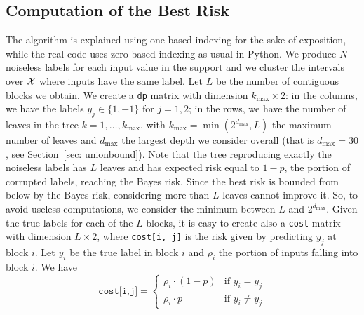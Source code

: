 \subsection{Computation of the Best Risk}\label{app: bestrisk} The algorithm is explained using one-based indexing for the sake of exposition, while the real code uses zero-based indexing as usual in Python. We produce $N$ noiseless labels for each input value in the support and we cluster the intervals over $\mathcal{X}$ where inputs have the same label. Let $L$ be the number of contiguous blocks we obtain. We create a \texttt{dp} matrix with dimension $k_{\max} \times 2$: in the columns, we have the labels $y_j \in\{1,-1\}$ for $j = 1,2$; in the rows, we have the number of leaves in the tree $k = 1,\ldots,k_{\max}$, with $k_{\max} = \min(2^{d_{\max}}, L)$ the maximum number of leaves and $d_{\max}$ the largest depth we consider overall (that is $d_{\max}=30$, see Section~\ref{sec: unionbound}). Note that the tree reproducing exactly the noiseless labels has $L$ leaves and has expected risk equal to $1-p$, the portion of corrupted labels, reaching the Bayes risk. Since the best risk is bounded from below by the Bayes risk, considering more than $L$ leaves cannot improve it. So, to avoid useless computations, we consider the minimum between $L$ and $2^{d_{\max}}$. Given the true labels for each of the $L$ blocks, it is easy to create also a \texttt{cost} matrix with dimension $L\times 2$, where \texttt{cost[i, j]} is the risk given by predicting  $y_j$ at block $i$. Let $y_i$ be the true label in block $i$ and $\rho_i$ the portion of inputs falling into block $i$. We have 
\[
\texttt{cost[i,j]} = \begin{cases}
    \rho_i \cdot (1-p) & \text{if } y_i = y_j\\
    \rho_i \cdot p & \text{if } y_i \neq y_j
\end{cases}
\]

